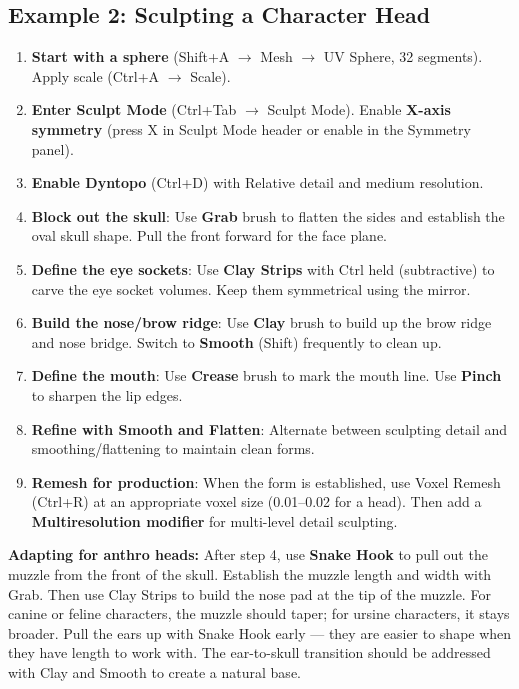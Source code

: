 \subsection{Example 2: Sculpting a Character Head}
\label{sec:headexample}

\begin{enumerate}[leftmargin=2em]
  \item \textbf{Start with a sphere} (Shift+A $\rightarrow$ Mesh $\rightarrow$ UV Sphere, 32 segments). Apply scale (Ctrl+A $\rightarrow$ Scale).

  \item \textbf{Enter Sculpt Mode} (Ctrl+Tab $\rightarrow$ Sculpt Mode). Enable \textbf{X-axis symmetry} (press X in Sculpt Mode header or enable in the Symmetry panel).

  \item \textbf{Enable Dyntopo} (Ctrl+D) with Relative detail and medium resolution.

  \item \textbf{Block out the skull}: Use \textbf{Grab} brush to flatten the sides and establish the oval skull shape. Pull the front forward for the face plane.

  \item \textbf{Define the eye sockets}: Use \textbf{Clay Strips} with Ctrl held (subtractive) to carve the eye socket volumes. Keep them symmetrical using the mirror.

  \item \textbf{Build the nose/brow ridge}: Use \textbf{Clay} brush to build up the brow ridge and nose bridge. Switch to \textbf{Smooth} (Shift) frequently to clean up.

  \item \textbf{Define the mouth}: Use \textbf{Crease} brush to mark the mouth line. Use \textbf{Pinch} to sharpen the lip edges.

  \item \textbf{Refine with Smooth and Flatten}: Alternate between sculpting detail and smoothing/flattening to maintain clean forms.

  \item \textbf{Remesh for production}: When the form is established, use Voxel Remesh (Ctrl+R) at an appropriate voxel size (0.01--0.02 for a head). Then add a \textbf{Multiresolution modifier} for multi-level detail sculpting.
\end{enumerate}

\begin{furrybox}
\textbf{Adapting for anthro heads:} After step 4, use \textbf{Snake Hook} to pull out the muzzle from the front of the skull. Establish the muzzle length and width with Grab. Then use Clay Strips to build the nose pad at the tip of the muzzle. For canine or feline characters, the muzzle should taper; for ursine characters, it stays broader. Pull the ears up with Snake Hook early --- they are easier to shape when they have length to work with. The ear-to-skull transition should be addressed with Clay and Smooth to create a natural base.
\end{furrybox}

